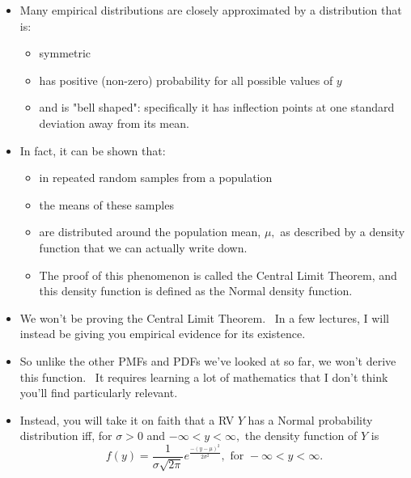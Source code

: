 \documentclass[11pt]{article}
\begin{document}
\begin{itemize}
\item Many empirical distributions are closely approximated by a
distribution that is:

\begin{itemize}
\item symmetric

\item has positive (non-zero) probability for all possible values of $y$

\item and is "bell shaped": specifically it has inflection points at one
standard deviation away from its mean.
\end{itemize}

\item In fact, it can be shown that:

\begin{itemize}
\item in repeated random samples from a population

\item the means of these samples

\item are distributed around the population mean, $\mu ,$ as described by a
density function that we can actually write down.

\item The proof of this phenomenon is called the Central Limit Theorem, and
this density function is defined as the Normal density function.
\end{itemize}

\item We won't be proving the Central Limit Theorem. \ In a few lectures, I
will instead be giving you empirical evidence for its existence. \ 

\item So unlike the other PMFs and PDFs we've looked at so far, we won't
derive this function. \ It requires learning a lot of mathematics that I
don't think you'll find particularly relevant.

\item Instead, you will take it on faith that a RV $Y$ has a Normal
probability distribution iff, for $\sigma >0$ and $-\infty <y<\infty ,$ the
density function of $Y$ is%
\begin{equation*}
f(y)=\frac{1}{\sigma \sqrt{2\pi }}e^{\frac{-(y-\mu )^{2}}{2\sigma ^{2}}},%
\text{ for }-\infty <y<\infty .
\end{equation*}


\end{itemize}
\end{document}
